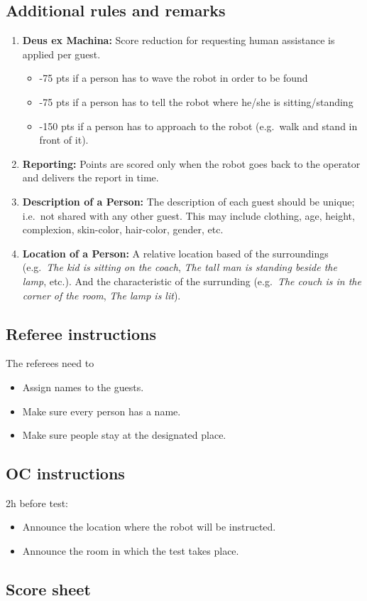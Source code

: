 \subsection*{Additional rules and remarks}
\begin{enumerate}[nosep]
	\item \textbf{Deus ex Machina:} Score reduction for requesting human assistance is applied per guest.
	\begin{itemize}
		\item -75 pts if a person has to wave the robot in order to be found
		\item -75 pts if a person has to tell the robot where he/she is sitting/standing
		\item -150 pts if a person has to approach to the robot (e.g.~walk and stand in front of it).
	\end{itemize}

	\item \textbf{Reporting:} Points are scored only when the robot goes back to the operator and delivers the report in time.

	\item \textbf{Description of a Person:} The description of each guest should be unique; i.e.~not shared with any other guest. This may include clothing, age, height, complexion, skin-color, hair-color, gender, etc.

	\item \textbf{Location of a Person:} A relative location based of the surroundings (e.g.~\textit{The kid is sitting on the coach}, \textit{The tall man is standing beside the lamp}, etc.). And the characteristic of the surrunding (e.g.~\textit{The couch is in the corner of the room}, \textit{The lamp is lit}). 
\end{enumerate}


\subsection*{Referee instructions}

The referees need to
\begin{itemize}
	\item Assign names to the guests.
	\item Make sure every person has a name.
	\item Make sure people stay at the designated place.
\end{itemize}

\subsection*{OC instructions}

2h before test:
\begin{itemize}
	\item Announce the location where the robot will be instructed.
	\item Announce the room in which the test takes place.
\end{itemize}

\subsection*{Score sheet}

